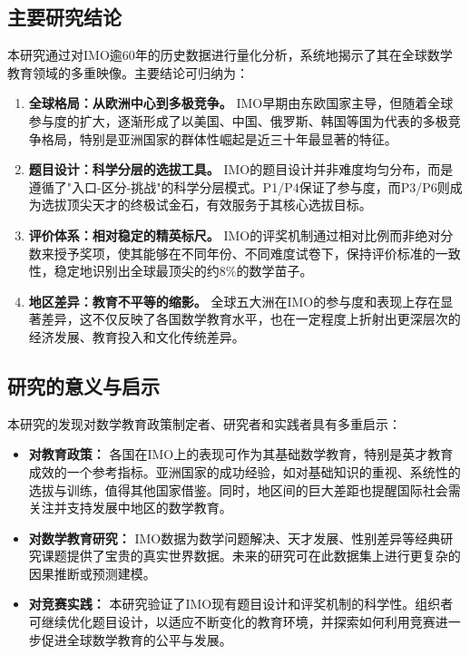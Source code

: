 \documentclass[12pt,a4paper]{article}
\begin{document}
\subsection{主要研究结论}
本研究通过对IMO逾60年的历史数据进行量化分析，系统地揭示了其在全球数学教育领域的多重映像。主要结论可归纳为：
\begin{enumerate}
    \item \textbf{全球格局：从欧洲中心到多极竞争。} IMO早期由东欧国家主导，但随着全球参与度的扩大，逐渐形成了以美国、中国、俄罗斯、韩国等国为代表的多极竞争格局，特别是亚洲国家的群体性崛起是近三十年最显著的特征。
    \item \textbf{题目设计：科学分层的选拔工具。} IMO的题目设计并非难度均匀分布，而是遵循了"入口-区分-挑战"的科学分层模式。P1/P4保证了参与度，而P3/P6则成为选拔顶尖天才的终极试金石，有效服务于其核心选拔目标。
    \item \textbf{评价体系：相对稳定的精英标尺。} IMO的评奖机制通过相对比例而非绝对分数来授予奖项，使其能够在不同年份、不同难度试卷下，保持评价标准的一致性，稳定地识别出全球最顶尖的约8\%的数学苗子。
    \item \textbf{地区差异：教育不平等的缩影。} 全球五大洲在IMO的参与度和表现上存在显著差异，这不仅反映了各国数学教育水平，也在一定程度上折射出更深层次的经济发展、教育投入和文化传统差异。
\end{enumerate}

\subsection{研究的意义与启示}
本研究的发现对数学教育政策制定者、研究者和实践者具有多重启示：
\begin{itemize}
    \item \textbf{对教育政策：} 各国在IMO上的表现可作为其基础数学教育，特别是英才教育成效的一个参考指标。亚洲国家的成功经验，如对基础知识的重视、系统性的选拔与训练，值得其他国家借鉴\cite{asian_mathematics_education}。同时，地区间的巨大差距也提醒国际社会需关注并支持发展中地区的数学教育。
    \item \textbf{对数学教育研究：} IMO数据为数学问题解决\cite{schoenfeld1985mathematical}、天才发展\cite{gifted_mathematics_education}、性别差异\cite{gender_mathematics_performance}等经典研究课题提供了宝贵的真实世界数据。未来的研究可在此数据集上进行更复杂的因果推断或预测建模。
    \item \textbf{对竞赛实践：} 本研究验证了IMO现有题目设计和评奖机制的科学性。组织者可继续优化题目设计，以适应不断变化的教育环境，并探索如何利用竞赛进一步促进全球数学教育的公平与发展。
\end{itemize}
\end{document}

